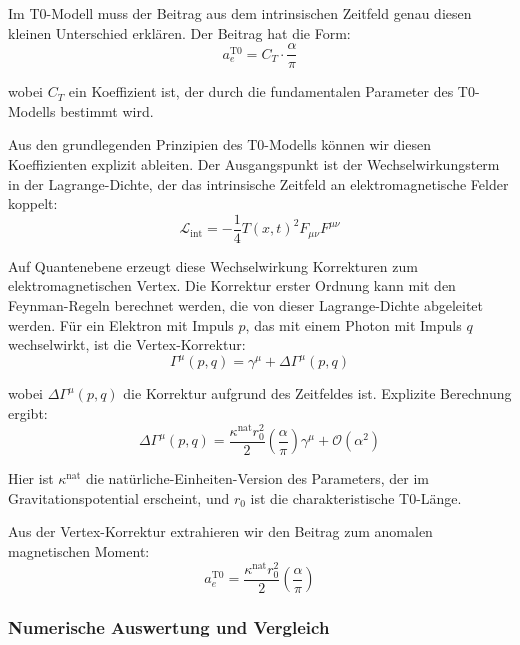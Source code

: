 \documentclass[12pt,a4paper]{article}
\newcommand{\Tfieldt}{T(x,t)}
\begin{document}
	Im T0-Modell muss der Beitrag aus dem intrinsischen Zeitfeld genau diesen kleinen Unterschied erklären. Der Beitrag hat die Form:
	\begin{equation}
		a_e^{\text{T0}} = C_T \cdot \frac{\alpha}{\pi}
	\end{equation}
	
	wobei $C_T$ ein Koeffizient ist, der durch die fundamentalen Parameter des T0-Modells bestimmt wird.
	
	Aus den grundlegenden Prinzipien des T0-Modells können wir diesen Koeffizienten explizit ableiten. Der Ausgangspunkt ist der Wechselwirkungsterm in der Lagrange-Dichte, der das intrinsische Zeitfeld an elektromagnetische Felder koppelt:
	\begin{equation}
		\mathcal{L}_{\text{int}} = -\frac{1}{4}\Tfieldt^2 F_{\mu\nu}F^{\mu\nu}
	\end{equation}
	
	Auf Quantenebene erzeugt diese Wechselwirkung Korrekturen zum elektromagnetischen Vertex. Die Korrektur erster Ordnung kann mit den Feynman-Regeln berechnet werden, die von dieser Lagrange-Dichte abgeleitet werden. Für ein Elektron mit Impuls $p$, das mit einem Photon mit Impuls $q$ wechselwirkt, ist die Vertex-Korrektur:
	\begin{equation}
		\Gamma^{\mu}(p,q) = \gamma^{\mu} + \Delta\Gamma^{\mu}(p,q)
	\end{equation}
	
	wobei $\Delta\Gamma^{\mu}(p,q)$ die Korrektur aufgrund des Zeitfeldes ist. Explizite Berechnung ergibt:
	\begin{equation}
		\Delta\Gamma^{\mu}(p,q) = \frac{\kappa^{\text{nat}}r_0^2}{2}\left(\frac{\alpha}{\pi}\right)\gamma^{\mu} + \mathcal{O}(\alpha^2)
	\end{equation}
	
	Hier ist $\kappa^{\text{nat}}$ die natürliche-Einheiten-Version des Parameters, der im Gravitationspotential erscheint, und $r_0$ ist die charakteristische T0-Länge.
	
	Aus der Vertex-Korrektur extrahieren wir den Beitrag zum anomalen magnetischen Moment:
	\begin{equation}
		a_e^{\text{T0}} = \frac{\kappa^{\text{nat}}r_0^2}{2}\left(\frac{\alpha}{\pi}\right)
	\end{equation}
	
	\subsubsection{Numerische Auswertung und Vergleich}
	
\end{document}
